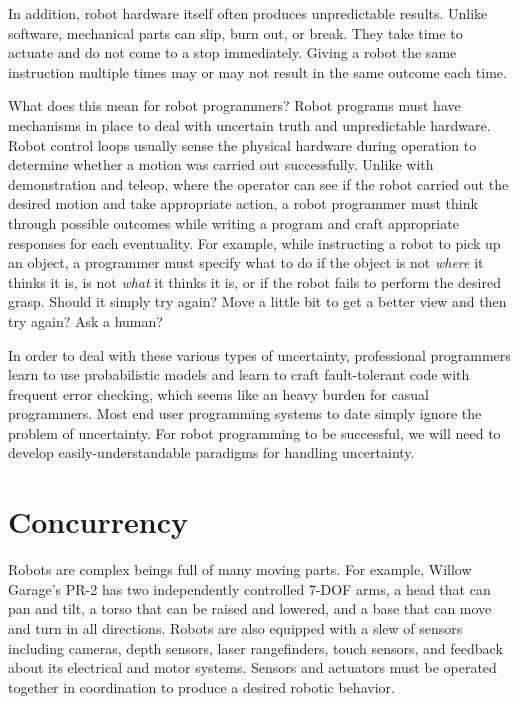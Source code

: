 \documentclass[10pt,twocolumn]{article}
\begin{document}
In addition, robot hardware itself often produces unpredictable results. Unlike software, mechanical parts can slip, burn out, or break. They take time to actuate and do not come to a stop immediately. Giving a robot the same instruction multiple times may or may not result in the same outcome each time.

What does this mean for robot programmers? Robot programs must have mechanisms in place to deal with uncertain truth and unpredictable hardware. Robot control loops usually sense the physical hardware during operation to determine whether a motion was carried out successfully. Unlike with demonstration and teleop, where the operator can see if the robot carried out the desired motion and take appropriate action, a robot programmer must think through possible outcomes while writing a program and craft appropriate responses for each eventuality. For example, while instructing a robot to pick up an object, a programmer must specify what to do if the object is not {\em where} it thinks it is, is not {\em what} it thinks it is, or if the robot fails to perform the desired grasp. Should it simply try again? Move a little bit to get a better view and then try again? Ask a human?

In order to deal with these various types of uncertainty, professional programmers learn to use probabilistic models and learn to craft fault-tolerant code with frequent error checking, which seems like an heavy burden for casual programmers. Most end user programming systems to date simply ignore the problem of uncertainty. For robot programming to be successful, we will need to develop easily-understandable paradigms for handling uncertainty.

\section{Concurrency}


Robots are complex beings full of many moving parts. For example, Willow Garage's PR-2 has two independently controlled 7-DOF arms, a head that can pan and tilt, a torso that can be raised and lowered, and a base that can move and turn in all directions. Robots are also equipped with a slew of sensors including cameras, depth sensors, laser rangefinders, touch sensors, and feedback about its electrical and motor systems. Sensors and actuators must be operated together in coordination to produce a desired robotic behavior.
\end{document}
